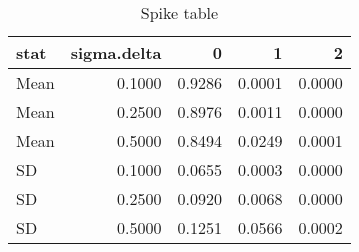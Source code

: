\begin{table}[ht]
\centering
\begin{tabular}{lrrrr}
  \hline
stat & sigma.delta & 0 & 1 & 2 \\ 
  \hline
Mean   & 0.1000 & 0.9286 & 0.0001 & 0.0000 \\ 
  Mean & 0.2500 & 0.8976 & 0.0011 & 0.0000 \\ 
  Mean & 0.5000 & 0.8494 & 0.0249 & 0.0001 \\ 
  SD   & 0.1000 & 0.0655 & 0.0003 & 0.0000 \\ 
  SD   & 0.2500 & 0.0920 & 0.0068 & 0.0000 \\ 
  SD   & 0.5000 & 0.1251 & 0.0566 & 0.0002 \\ 
   \hline
\end{tabular}
\caption{Spike table} 
\end{table}
